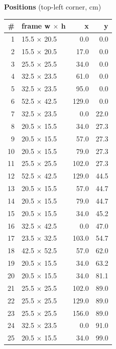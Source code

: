 \documentclass[a4paper,landscape,10pt]{article}
\begin{document}
\begin{minipage}[t]{0.25\textwidth}
\vspace{8pt}
{\bfseries Positions} (top-left corner, cm)\\[2pt]
\tiny
\begin{tabular}{@{}r l r r@{}}
\toprule
\# & frame w $\times$ h & x & y \\
\midrule
1 & 15.5 $\times$ 20.5 & 0.0 & 0.0 \\
2 & 15.5 $\times$ 20.5 & 17.0 & 0.0 \\
3 & 25.5 $\times$ 25.5 & 34.0 & 0.0 \\
4 & 32.5 $\times$ 23.5 & 61.0 & 0.0 \\
5 & 32.5 $\times$ 23.5 & 95.0 & 0.0 \\
6 & 52.5 $\times$ 42.5 & 129.0 & 0.0 \\
7 & 32.5 $\times$ 23.5 & 0.0 & 22.0 \\
8 & 20.5 $\times$ 15.5 & 34.0 & 27.3 \\
9 & 20.5 $\times$ 15.5 & 57.0 & 27.3 \\
10 & 20.5 $\times$ 15.5 & 79.0 & 27.3 \\
11 & 25.5 $\times$ 25.5 & 102.0 & 27.3 \\
12 & 52.5 $\times$ 42.5 & 129.0 & 44.5 \\
13 & 20.5 $\times$ 15.5 & 57.0 & 44.7 \\
14 & 20.5 $\times$ 15.5 & 79.0 & 44.7 \\
15 & 20.5 $\times$ 15.5 & 34.0 & 45.2 \\
16 & 32.5 $\times$ 42.5 & 0.0 & 47.0 \\
17 & 23.5 $\times$ 32.5 & 103.0 & 54.7 \\
18 & 42.5 $\times$ 52.5 & 57.0 & 62.0 \\
19 & 20.5 $\times$ 15.5 & 34.0 & 63.2 \\
20 & 20.5 $\times$ 15.5 & 34.0 & 81.1 \\
21 & 25.5 $\times$ 25.5 & 102.0 & 89.0 \\
22 & 25.5 $\times$ 25.5 & 129.0 & 89.0 \\
23 & 25.5 $\times$ 25.5 & 156.0 & 89.0 \\
24 & 32.5 $\times$ 23.5 & 0.0 & 91.0 \\
25 & 20.5 $\times$ 15.5 & 34.0 & 99.0 \\
\bottomrule
\end{tabular}
\end{minipage}
\clearpage
\end{document}

